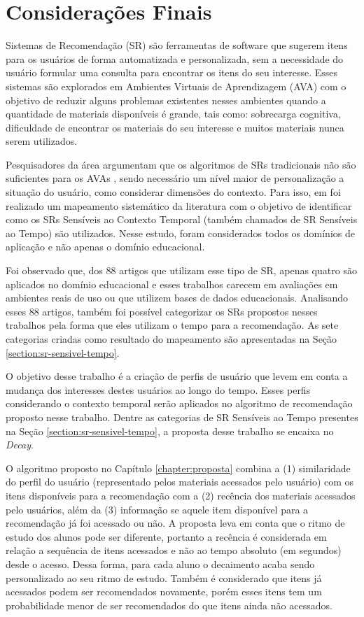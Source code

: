 \chapter{Considerações Finais}\label{chapter:conclusoes}

Sistemas de Recomendação (SR) são ferramentas de software que sugerem itens para os usuários de forma automatizada e personalizada,
sem a necessidade do usuário formular uma consulta para encontrar os itens do seu interesse. Esses sistemas são
explorados em Ambientes Virtuais de Aprendizagem (AVA) com o objetivo de reduzir alguns problemas existentes nesses ambientes
quando a quantidade de materiais disponíveis é grande, tais como: sobrecarga cognitiva, dificuldade de encontrar os materiais
do seu interesse e muitos materiais nunca serem utilizados.

Pesquisadores da área argumentam que os algoritmos de SRs tradicionais não são suficientes para os AVAs \cite{verbert2012context, drachsler2015panorama},
sendo necessário um nível maior de personalização a situação do usuário, como considerar dimensões do contexto. Para isso,
em  foi realizado um mapeamento sistemático da literatura com o objetivo de identificar como os SRs Sensíveis
ao Contexto Temporal (também chamados de SR Sensíveis ao Tempo) são utilizados. Nesse estudo, foram considerados todos os domínios
de aplicação e não apenas o domínio educacional.

Foi observado que, dos 88 artigos que utilizam esse tipo de SR, apenas quatro são aplicados no domínio educacional e esses
trabalhos carecem em avaliações em ambientes reais de uso ou que utilizem bases de dados educacionais. Analisando esses
88 artigos, também foi possível categorizar os SRs propostos nesses trabalhos pela forma que eles utilizam o tempo para
a recomendação. As sete categorias criadas como resultado do mapeamento são apresentadas na Seção \ref{section:sr-sensivel-tempo}.

O objetivo desse trabalho é a criação de perfis de usuário que levem em conta a mudança dos interesses destes usuários
ao longo do tempo. Esses perfis considerando o contexto temporal serão aplicados no algoritmo de recomendação proposto nesse
trabalho. Dentre as categorias de SR Sensíveis ao Tempo presentes na Seção \ref{section:sr-sensivel-tempo}, a proposta
desse trabalho se encaixa no \textit{Decay}.

O algoritmo proposto no Capítulo \ref{chapter:proposta} combina a (1) similaridade do perfil do usuário (representado
pelos materiais acessados pelo usuário) com os itens disponíveis para a recomendação com a (2) recência dos materiais
acessados pelo usuários, além da (3) informação se aquele item disponível para a recomendação já foi acessado ou não. A
proposta leva em conta que o ritmo de estudo dos alunos pode ser diferente, portanto a recência é considerada em relação
a sequência de itens acessados e não ao tempo absoluto (em segundos) desde o acesso. Dessa forma, para cada aluno o
decaimento acaba sendo personalizado ao seu ritmo de estudo. Também é considerado que itens já acessados podem ser
recomendados novamente, porém esses itens tem um probabilidade menor de ser recomendados do que itens ainda não acessados.

